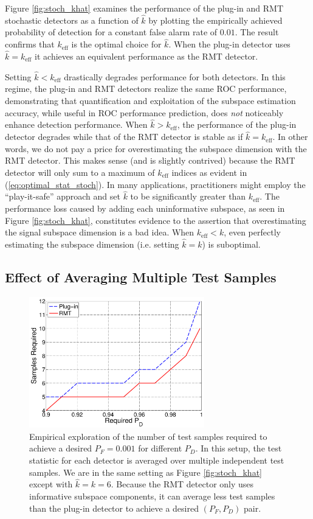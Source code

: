 Figure \ref{fig:stoch_khat} examines the performance of the plug-in and RMT stochastic detectors as a function of $\widehat{k}$ by plotting the empirically achieved probability of detection for a constant false alarm rate of $0.01$. The result confirms that $k_\text{eff}$ is the optimal choice for $\widehat{k}$. When the plug-in detector uses $\widehat{k} = k_\text{eff}$ it achieves an equivalent performance as the RMT detector.

Setting $\widehat{k} < k_\text{eff}$ drastically degrades performance for both detectors. In this regime, the plug-in and RMT detectors realize the same ROC performance, demonstrating that quantification and exploitation of the subspace estimation accuracy, while useful in ROC performance prediction, does \textit{not} noticeably enhance detection performance. When $\widehat{k} > k_\text{eff}$, the performance of the plug-in detector degrades while that of the RMT detector is stable as if $\widehat{k}=k_\text{eff}$. In other words, we do not pay a price for overestimating the subspace dimension with the RMT detector. This makes sense (and is slightly contrived) because the RMT detector will only sum to a maximum of $k_\text{eff}$ indices as evident in (\ref{eq:optimal_stat_stoch}). In many applications, practitioners might employ the ``play-it-safe'' approach and set $\widehat{k}$ to be significantly greater than $k_\text{eff}$. The performance loss caused by adding each uninformative subspace, as seen in Figure \ref{fig:stoch_khat}, constitutes evidence to the assertion that overestimating the signal subspace dimension is a bad idea. When $k_\text{eff} < k$, even perfectly estimating the subspace dimension (i.e. setting $\widehat{k} = k$) is suboptimal.


\subsection{Effect of Averaging Multiple Test Samples}
\begin{figure}
\centering
\includegraphics[width=3in]{figures/stoch_samples.pdf}
\caption{Empirical exploration of the number of test samples required to achieve a desired $P_F=0.001$ for different $P_D$. In this setup, the test statistic for each detector is averaged over multiple independent test samples. We are in the same setting as Figure \ref{fig:stoch_khat} except with $\widehat{k}=k=6$. Because the RMT detector only uses informative subspace components, it can average less test samples than the plug-in detector to achieve a desired $(P_F, P_D)$ pair.}
\label{fig:stoch_samples}
\end{figure}

